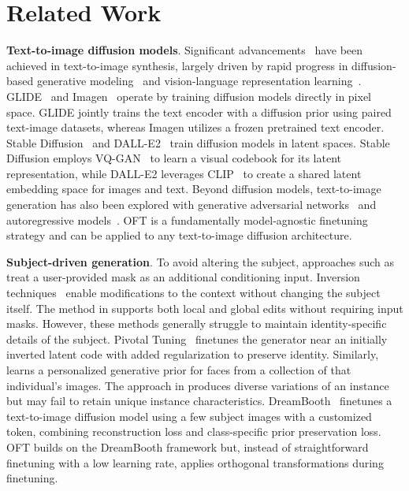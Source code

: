 \section{Related Work}

\textbf{Text-to-image diffusion models}. Significant advancements~\cite{saharia2022photorealistic,ramesh2022hierarchical,rombach2022high,gu2022vector,nichol2022glide} have been achieved in text-to-image synthesis, largely driven by rapid progress in diffusion-based generative modeling~\cite{ho2020denoising,song2021score,song2021denoising,dhariwal2021diffusion} and vision-language representation learning~\cite{su2020vlbert,lu2019vilbert,radford2021learning,wang2021simvlm,li2022blip,li2023blip,alayrac2022flamingo,schuhmann2022laion}. GLIDE~\cite{nichol2022glide} and Imagen~\cite{saharia2022photorealistic} operate by training diffusion models directly in pixel space. GLIDE jointly trains the text encoder with a diffusion prior using paired text-image datasets, whereas Imagen utilizes a frozen pretrained text encoder. Stable Diffusion~\cite{rombach2022high} and DALL-E2~\cite{ramesh2022hierarchical} train diffusion models in latent spaces. Stable Diffusion employs VQ-GAN~\cite{esser2021taming} to learn a visual codebook for its latent representation, while DALL-E2 leverages CLIP~\cite{radford2021learning} to create a shared latent embedding space for images and text. Beyond diffusion models, text-to-image generation has also been explored with generative adversarial networks~\cite{reed2016generative,zhang2017stackgan,xu2018attngan,li2019controllable} and autoregressive models~\cite{ramesh2021zero,ding2021cogview,wu2022nuwa,yuscaling}. OFT is a fundamentally model-agnostic finetuning strategy and can be applied to any text-to-image diffusion architecture.

\textbf{Subject-driven generation}. To avoid altering the subject, approaches such as \cite{avrahami2022blended,nichol2022glide} treat a user-provided mask as an additional conditioning input. Inversion techniques~\cite{choi2021ilvr,dhariwal2021diffusion,ramesh2022hierarchical,gal2022image} enable modifications to the context without changing the subject itself. The method in \cite{hertz2022prompt} supports both local and global edits without requiring input masks. However, these methods generally struggle to maintain identity-specific details of the subject. Pivotal Tuning~\cite{roich2022pivotal} finetunes the generator near an initially inverted latent code with added regularization to preserve identity. Similarly, \cite{nitzan2022mystyle} learns a personalized generative prior for faces from a collection of that individual’s images. The approach in \cite{casanova2021instance} produces diverse variations of an instance but may fail to retain unique instance characteristics. DreamBooth~\cite{ruiz2023dreambooth} finetunes a text-to-image diffusion model using a few subject images with a customized token, combining reconstruction loss and class-specific prior preservation loss. OFT builds on the DreamBooth framework but, instead of straightforward finetuning with a low learning rate, applies orthogonal transformations during finetuning.

